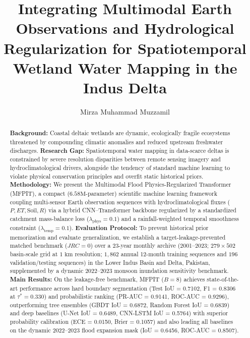 \documentclass[preprint,12pt]{elsarticle}
\providecommand{\affiliation}[2][]{\address[#1]{#2}}
\begin{document}
\begin{frontmatter}

\title{Integrating Multimodal Earth Observations and Hydrological Regularization for Spatiotemporal Wetland Water Mapping in the Indus Delta}

\author[inst1]{Mirza Muhammad Muzzamil}


\affiliation[inst1]{
    organization={NED University of Engineering and Technology},
    addressline={University Road},
    city={Karachi},
    postcode={75270},
    country={Pakistan}
}


\begin{abstract}
\textbf{Background:} Coastal deltaic wetlands are dynamic, ecologically fragile ecosystems threatened by compounding climatic anomalies and reduced upstream freshwater discharges. 
\textbf{Research Gap:} Spatiotemporal water mapping in data-scarce deltas is constrained by severe resolution disparities between remote sensing imagery and hydroclimatological drivers, alongside the tendency of standard machine learning to violate physical conservation principles and overfit static historical priors. 
\textbf{Methodology:} We present the Multimodal Flood Physics-Regularized Transformer (MFPIT), a compact ($6.58\text{M}$-parameter) scientific machine learning framework coupling multi-sensor Earth observation sequences with hydroclimatological fluxes ($P, ET, \text{Soil}, R$) via a hybrid CNN--Transformer backbone regularized by a standardized catchment mass-balance loss ($\lambda_{\text{phys}} = 0.1$) and a rainfall-weighted temporal smoothness constraint ($\lambda_{\text{temp}} = 0.1$). 
\textbf{Evaluation Protocol:} To prevent historical prior memorization and evaluate generalization, we establish a target-leakage-prevented matched benchmark ($JRC = 0$) over a 23-year monthly archive (2001--2023; $279 \times 502$ basin-scale grid at $1\text{ km}$ resolution; $1,862$ annual 12-month training sequences and $196$ validation/testing sequences) in the Lower Indus Basin and Delta, Pakistan, supplemented by a dynamic 2022--2023 monsoon inundation sensitivity benchmark. 
\textbf{Main Results:} On the leakage-free benchmark, MFPIT ($B=8$) achieves state-of-the-art performance across hard boundary segmentation (Test IoU = 0.7102, F1 = 0.8306 at $\tau^* = 0.330$) and probabilistic ranking (PR-AUC = 0.9141, ROC-AUC = 0.9296), outperforming tree ensembles (GBDT IoU = 0.6872, Random Forest IoU = 0.6839) and deep baselines (U-Net IoU = 0.6489, CNN-LSTM IoU = 0.5764) with superior probability calibration (ECE = 0.0150, Brier = 0.1057) and also leading all baselines on the dynamic 2022--2023 flood expansion mask (IoU = 0.6456, ROC-AUC = 0.8507). 

\end{abstract}
\end{frontmatter}
\end{document}
